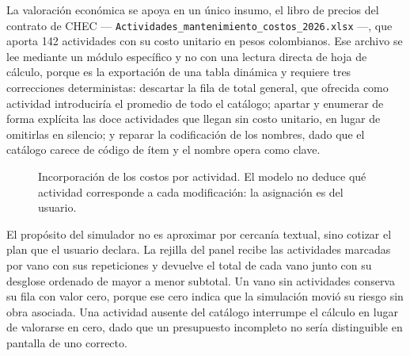 \documentclass[11pt,a4paper]{article}
\begin{document}
La valoración económica se apoya en un único insumo, el libro de precios del contrato de CHEC
--- \texttt{Actividades\_mantenimiento\_costos\_2026.xlsx} ---, que aporta 142 actividades con su
costo unitario en pesos colombianos. Ese archivo se lee mediante un módulo específico y no con
una lectura directa de hoja de cálculo, porque es la exportación de una tabla dinámica y
requiere tres correcciones deterministas: descartar la fila de total general, que ofrecida como
actividad introduciría el promedio de todo el catálogo; apartar y enumerar de forma explícita
las doce actividades que llegan sin costo unitario, en lugar de omitirlas en silencio; y reparar
la codificación de los nombres, dado que el catálogo carece de código de ítem y el nombre opera
como clave.

\begin{figure}[H]
\centering
{}
\caption{Incorporación de los costos por actividad. El modelo no deduce qué actividad
corresponde a cada modificación: la asignación es del usuario.}
\label{fig:costos}
\end{figure}

El propósito del simulador no es aproximar por cercanía textual, sino cotizar el plan que el
usuario declara. La rejilla del panel recibe las actividades marcadas por vano con sus
repeticiones y devuelve el total de cada vano junto con su desglose ordenado de mayor a menor
subtotal. Un vano sin actividades conserva su fila con valor cero, porque ese cero indica que la
simulación movió su riesgo sin obra asociada. Una actividad ausente del catálogo interrumpe el
cálculo en lugar de valorarse en cero, dado que un presupuesto incompleto no sería distinguible
en pantalla de uno correcto.
\end{document}
